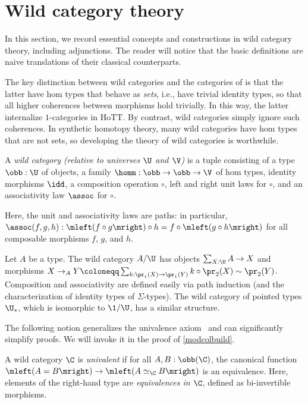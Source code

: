 \documentclass{lmcs}
\theoremstyle{definition}\newtheorem{note}[thm]{Note}
\begin{document}
\section{Wild category theory} \label{wildcats}

In this section, we record essential concepts and constructions in wild category theory, including adjunctions. The reader will notice that the basic definitions are naive translations of their classical counterparts.

The key distinction between wild categories and the categories of \cite[Section 9.1]{Uni13} is that the latter have hom types that behave as \emph{sets}, i.e., have trivial identity types, so that all higher coherences between morphisms hold trivially. In this way, the latter internalize $1$-categories in HoTT. By contrast, wild categories simply ignore such coherences. In synthetic homotopy theory, many wild categories have hom types that are not sets, so developing the theory of wild categories is worthwhile.

\begin{defi}
  A \emph{wild category (relative to universes $\U$ and $\V$)} is a tuple consisting of a type $\obb : \U$ of objects, a family $\homm : \obb \to \obb \to \V$ of hom types, identity morphisms $\idd$, a composition operation $\circ$, left and right unit laws for $\circ$, and an associativity law $\assoc$ for $\circ$.
  
  Here, the unit and associativity laws are paths: in particular, $\assoc(f,g,h) : \mleft(f \circ g\mright) \circ h = f \circ \mleft(g \circ h\mright)$ for all composable morphisms $f$, $g$, and $h$.
\end{defi}

\begin{exa}
Let $A$ be a type. The wild category $A/\U$ has objects $\sum_{X : \U}A \to X$ and morphisms $X \to_A Y \coloneqq \sum_{k : \pr_1(X) \to \pr_1(Y)}k \circ \pr_2(X) \sim \pr_2(Y)$. Composition and associativity are defined easily via path induction (and the characterization of identity types of $\Sigma$-types). The wild category of pointed types $\U_{\ast}$, which is isomorphic to $\1/\U$, has a similar structure.
\end{exa}

The following notion generalizes the univalence axiom~\cite[Axiom 2.10.3]{Uni13} and can significantly simplify proofs. We will invoke it in the proof of \autoref{modcolbuild}.
\begin{defi} \label{unvwc}
  A wild category $\C$ is \emph{univalent} if for all $A , B : \obb(\C)$, the canonical function $\mleft(A = B\mright) \to \mleft(A \simeq_{\C} B\mright)$ is an equivalence. Here, elements of the right-hand type are \emph{equivalences in $\C$}, defined as bi-invertible morphisms.
\end{defi}
\end{document}
